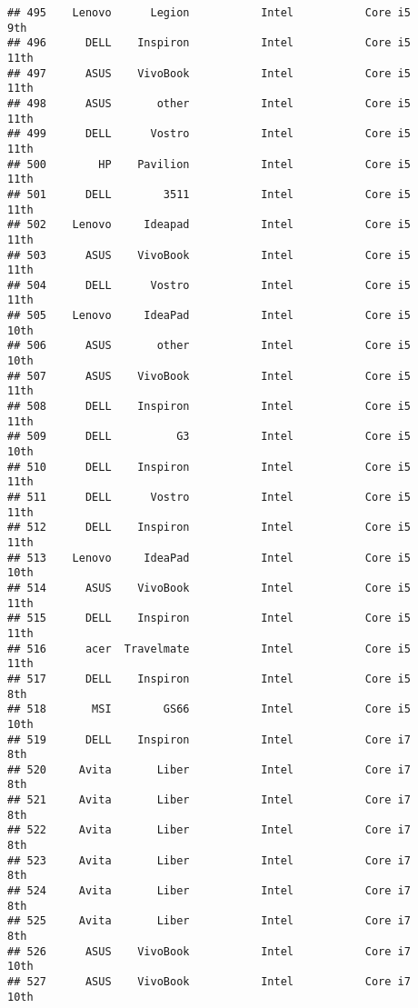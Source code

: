 \documentclass[
]{article}
\begin{document}
\begin{verbatim}
## 495    Lenovo      Legion           Intel           Core i5             9th
## 496      DELL    Inspiron           Intel           Core i5            11th
## 497      ASUS    VivoBook           Intel           Core i5            11th
## 498      ASUS       other           Intel           Core i5            11th
## 499      DELL      Vostro           Intel           Core i5            11th
## 500        HP    Pavilion           Intel           Core i5            11th
## 501      DELL        3511           Intel           Core i5            11th
## 502    Lenovo     Ideapad           Intel           Core i5            11th
## 503      ASUS    VivoBook           Intel           Core i5            11th
## 504      DELL      Vostro           Intel           Core i5            11th
## 505    Lenovo     IdeaPad           Intel           Core i5            10th
## 506      ASUS       other           Intel           Core i5            10th
## 507      ASUS    VivoBook           Intel           Core i5            11th
## 508      DELL    Inspiron           Intel           Core i5            11th
## 509      DELL          G3           Intel           Core i5            10th
## 510      DELL    Inspiron           Intel           Core i5            11th
## 511      DELL      Vostro           Intel           Core i5            11th
## 512      DELL    Inspiron           Intel           Core i5            11th
## 513    Lenovo     IdeaPad           Intel           Core i5            10th
## 514      ASUS    VivoBook           Intel           Core i5            11th
## 515      DELL    Inspiron           Intel           Core i5            11th
## 516      acer  Travelmate           Intel           Core i5            11th
## 517      DELL    Inspiron           Intel           Core i5             8th
## 518       MSI        GS66           Intel           Core i5            10th
## 519      DELL    Inspiron           Intel           Core i7             8th
## 520     Avita       Liber           Intel           Core i7             8th
## 521     Avita       Liber           Intel           Core i7             8th
## 522     Avita       Liber           Intel           Core i7             8th
## 523     Avita       Liber           Intel           Core i7             8th
## 524     Avita       Liber           Intel           Core i7             8th
## 525     Avita       Liber           Intel           Core i7             8th
## 526      ASUS    VivoBook           Intel           Core i7            10th
## 527      ASUS    VivoBook           Intel           Core i7            10th

\end{verbatim}
\end{document}
